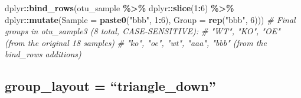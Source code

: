 \documentclass[
]{book}
\newenvironment{Shaded}{\begin{snugshade}}{\end{snugshade}}
\newcommand{\AttributeTok}[1]{\textcolor[rgb]{0.13,0.29,0.53}{#1}}
\newcommand{\CommentTok}[1]{\textcolor[rgb]{0.56,0.35,0.01}{\textit{#1}}}
\newcommand{\DecValTok}[1]{\textcolor[rgb]{0.00,0.00,0.81}{#1}}
\newcommand{\FunctionTok}[1]{\textcolor[rgb]{0.13,0.29,0.53}{\textbf{#1}}}
\newcommand{\NormalTok}[1]{#1}
\newcommand{\SpecialCharTok}[1]{\textcolor[rgb]{0.81,0.36,0.00}{\textbf{#1}}}
\newcommand{\StringTok}[1]{\textcolor[rgb]{0.31,0.60,0.02}{#1}}
\begin{document}
\begin{Shaded}
\begin{Highlighting}[]
\NormalTok{  dplyr}\SpecialCharTok{::}\FunctionTok{bind\_rows}\NormalTok{(otu\_sample }\SpecialCharTok{\%\textgreater{}\%}\NormalTok{ dplyr}\SpecialCharTok{::}\FunctionTok{slice}\NormalTok{(}\DecValTok{1}\SpecialCharTok{:}\DecValTok{6}\NormalTok{) }\SpecialCharTok{\%\textgreater{}\%}
\NormalTok{                     dplyr}\SpecialCharTok{::}\FunctionTok{mutate}\NormalTok{(}\AttributeTok{Sample =} \FunctionTok{paste0}\NormalTok{(}\StringTok{"bbb"}\NormalTok{, }\DecValTok{1}\SpecialCharTok{:}\DecValTok{6}\NormalTok{), }\AttributeTok{Group =} \FunctionTok{rep}\NormalTok{(}\StringTok{"bbb"}\NormalTok{, }\DecValTok{6}\NormalTok{)))}
\CommentTok{\# Final groups in otu\_sample3 (8 total, CASE{-}SENSITIVE):}
\CommentTok{\#   "WT", "KO", "OE"  (from the original 18 samples)}
\CommentTok{\#   "ko", "oe", "wt", "aaa", "bbb"  (from the bind\_rows additions)}
\end{Highlighting}
\end{Shaded}

\subsection{group\_layout = ``triangle\_down''}\label{group_layout-triangle_down}
\end{document}
